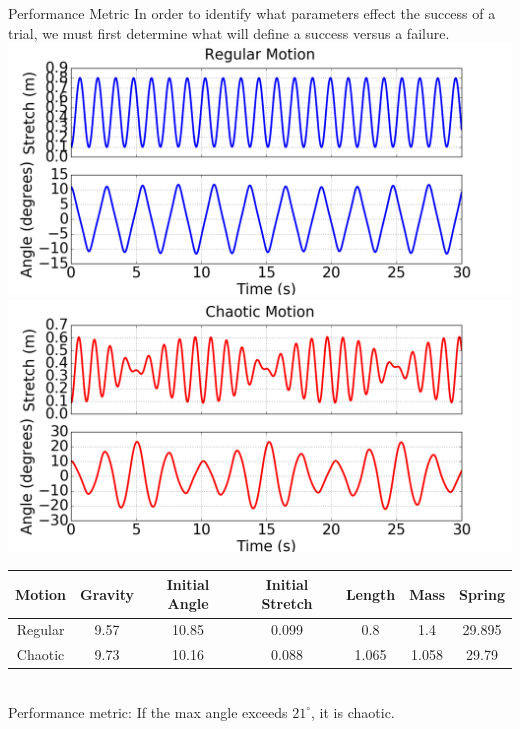 \documentclass{beamer}
\begin{document}
\begin{frame}{Performance Metric}
\centering
In order to identify what parameters effect the success of a trial, we must first determine what will define a success versus a failure.\newline \newline
\includegraphics[scale=0.18]{images/RegularMotion.png} 
\includegraphics[scale=0.18]{images/ChaoticMotion.png} \\
\vspace{12 pt}
\small
    \begin{tabular}{| c | c | c | c | c | c | c |}
    \hline
    Motion & Gravity & Initial Angle & Initial Stretch & Length & Mass & Spring \\ \hline
    Regular & 9.57 & 10.85 & 0.099 & 0.8 & 1.4 & 29.895 \\ 
    Chaotic & 9.73 & 10.16 & 0.088 & 1.065 & 1.058 & 29.79 \\ \hline
\end{tabular} \\
\vspace{10 pt}
Performance metric: If the max angle exceeds $21^{\circ}$, it is chaotic.
\end{frame}
\end{document}
